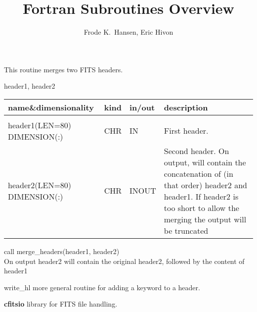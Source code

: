 
\sloppy

\title{\healpix Fortran Subroutines Overview}
 \section[merge\_headers]{ }
\label{sub:merge_headers}
\author{Frode K.~Hansen, Eric Hivon}

\begin{facility}
{This routine merges two FITS headers.}
{\modHeadFits}
\end{facility}

\begin{f90format}
{header1, header2}
\end{f90format}

\begin{arguments}
{
\begin{tabular}{p{0.4\hsize} p{0.05\hsize} p{0.1\hsize} p{0.35\hsize}} \hline  
\textbf{name\&dimensionality} & \textbf{kind} & \textbf{in/out} & \textbf{description} \\ \hline
                   &   &   &                           \\ %
header1(LEN=80) DIMENSION(:) & CHR & IN & First header. \\
header2(LEN=80) DIMENSION(:) & CHR & INOUT & Second header. On output,
                   will contain the concatenation of (in that order) header2 and
                   header1. If header2 is too short to allow the
                   merging the output will be truncated\\
\end{tabular}
}
\end{arguments}

\begin{example}
{
call merge\_headers(header1, header2)  \\
}
{
On output header2 will contain the original header2, followed by the
content of header1
}
\end{example}

\begin{modules}
  \begin{sulist}{} %
  \item[write\_hl] more general routine for adding a keyword to a header.
  \item[\textbf{cfitsio}] library for FITS file handling.		
  \end{sulist}
\end{modules}

